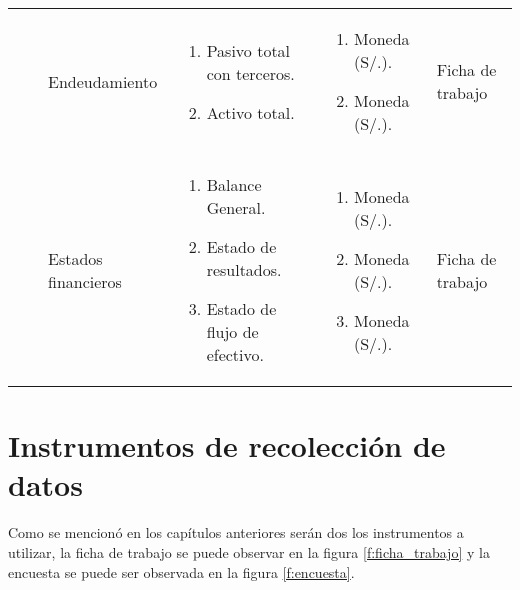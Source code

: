 \begin{sidewaystable}[htbp]
\begin{tabular}{|p{2.3cm}|p{3.5cm}|p{2.5cm}|p{5cm}|p{4cm}|p{3cm}|}
 & & Endeudamiento &
 \begin{enumerate}[nosep]
   \item Pasivo total con terceros.
   \item Activo total.
 \end{enumerate} &
 \begin{enumerate}[nosep]
   \item Moneda (S/.).
   \item Moneda (S/.).
 \end{enumerate} & Ficha de trabajo \\ \cline{3-6}
 & & Estados financieros &
 \begin{enumerate}[nosep]
   \item Balance General.
   \item Estado de resultados.
   \item Estado de flujo de efectivo.
 \end{enumerate} &
 \begin{enumerate}[nosep]
   \item Moneda (S/.).
   \item Moneda (S/.).
   \item Moneda (S/.).
 \end{enumerate} & Ficha de trabajo \\ \hline
\end{tabular}
\end{sidewaystable}

\section{Instrumentos de recolección de datos}
Como se mencionó en los capítulos anteriores serán dos los instrumentos a utilizar,
la ficha de trabajo se puede observar en la figura \ref{f:ficha_trabajo} y la encuesta
se puede ser observada en la figura \ref{f:encuesta}.

